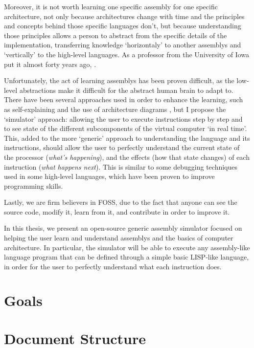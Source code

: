 Moreover, it is not worth learning one specific \gls{assembly} for one specific architecture, not only because architectures change with time and the principles and concepts behind those specific languages don't, but because understanding those principles allows a person to abstract from the specific details of the implementation, transferring knowledge `horizontaly' to another \glspl{assembly} and `vertically' to the \glspl{high-level language}. As a professor from the University of Iowa put it almost forty years ago, .


Unfortunately, the act of learning \glspl{assembly} has been proven difficult, as the low-level abstractions make it difficult for the abstract human brain to adapt to. There have been several approaches used in order to enhance the learning, such as self-explaining and the use of architecture diagrams \supercite{HungY.-C2012CSWC}, but I propose the `simulator' approach: allowing the user to execute instructions step by step and to see state of the different subcomponents of the virtual computer `in real time'. This, added to the more `generic' approach to understanding the language and its instructions, should allow the user to perfectly understand the current state of the processor (\textit{what's happening}), and the effects (how that state changes) of each instruction (\textit{what happens next}). This is similar to some \gls{debugging} techniques used in some \glspl{high-level language}, which have been proven to improve programming skills\supercite{KLAHR1988362}.


Lastly, we are firm believers in \gls{FOSS}, due to the fact that anyone can see the source code, modify it, learn from it, and contribute in order to improve it.


In this thesis, we present an open-source generic \gls{assembly} simulator focused on helping the user learn and understand \glspl{assembly} and the basics of computer architecture. In particular, the simulator will be able to execute any assembly-like language program that can be defined through a simple basic LISP-like language, in order for the user to perfectly understand what each instruction does.



\section{Goals}\label{sec:goals}


\section{Document Structure}\label{sec:structure}


